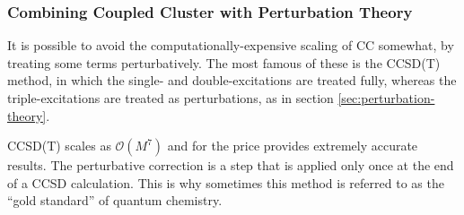 \subsubsection{Combining Coupled Cluster with Perturbation Theory}

It is possible to avoid the computationally-expensive scaling of CC somewhat, by treating some terms perturbatively. The most famous of these is the \gls{CCSD(T)} method,\cite{raghavachariFifthorder1989} in which the single- and double-excitations are treated fully, whereas the triple-excitations are treated as perturbations, as in section \ref{sec:perturbation-theory}.

\gls{CCSD(T)} scales as $\mathcal{O}(M^7)$ and for the price provides extremely accurate results. The perturbative correction is a step that is applied only once at the end of a \gls{CCSD} calculation. This is why sometimes this method is referred to as the ``gold standard'' of quantum chemistry.

